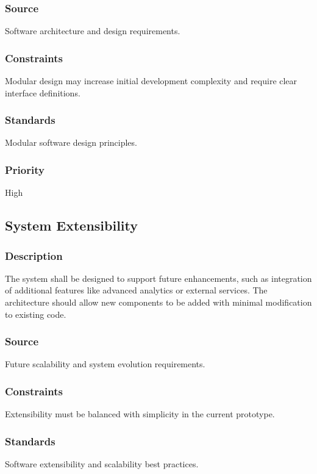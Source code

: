 \subsubsection{Source}
Software architecture and design requirements.

\subsubsection{Constraints}
Modular design may increase initial development complexity and require clear interface definitions.

\subsubsection{Standards}
Modular software design principles.

\subsubsection{Priority}
High


\subsection{System Extensibility}
\subsubsection{Description}
The system shall be designed to support future enhancements, such as integration of additional features like advanced analytics or external services. The architecture should allow new components to be added with minimal modification to existing code.

\subsubsection{Source}
Future scalability and system evolution requirements.

\subsubsection{Constraints}
Extensibility must be balanced with simplicity in the current prototype.

\subsubsection{Standards}
Software extensibility and scalability best practices.

